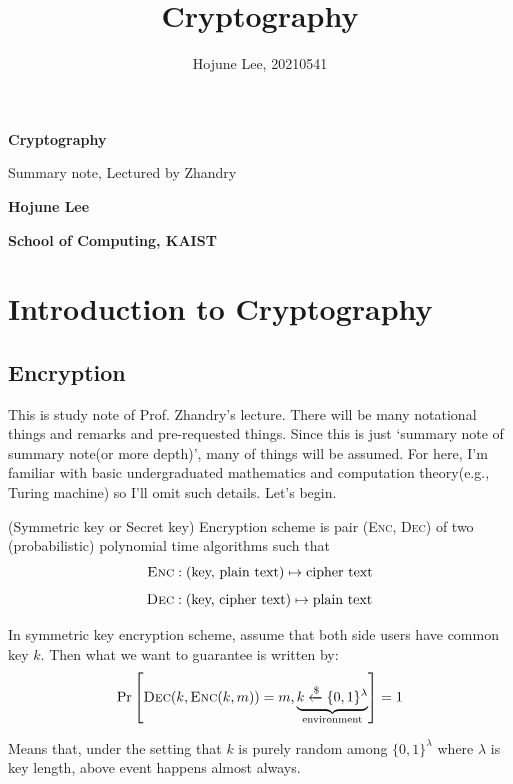 \documentclass[12pt, a4paper, openany, twoside]{book}
\author{Hojune Lee, 20210541}
\title{Cryptography}
\theoremstyle{definition}
\theoremstyle{remark}
\theoremstyle{plain}
\numberwithin{equation}{section}
\begin{document}
\begin{titlepage}
    \begin{center}
        \vspace*{9cm}
            
        \Huge
        \textbf{Cryptography}
    
        \vspace{1cm}
        \large
        Summary note, Lectured by Zhandry
        \vspace{3cm}
        
        \LARGE
        \textbf{Hojune Lee}
            
        \vspace{8cm}
            
        \normalsize
        \textbf{School of Computing, KAIST}\\  
    \end{center}
\end{titlepage}

\hypersetup{linkcolor=black}
\tableofcontents
\hypersetup{linkcolor=blue}

\newpage 

\chapter{Introduction to Cryptography}

\section{Encryption}

This is study note of Prof. Zhandry's lecture\cite{zhandry_crypto}. 
There will be many notational things and remarks and pre-requested things. 
Since this is just \lq summary note of summary note(or more depth)', many of things will be assumed. 
For here, I'm familiar with basic undergraduated mathematics and computation theory(e.g., Turing machine) 
so I'll omit such details. Let's begin. 

\begin{tcolorbox}[colback=yellow!10!white,colframe=red!75!black,title=Encryption(Symmetric key or Secret Key)]

(Symmetric key or Secret key) Encryption scheme is pair (\textsc{Enc}, \textsc{Dec}) of two (probabilistic) polynomial time algorithms such that 
\[\textsc{Enc} : (\text{key, plain text}) \mapsto \text{cipher text}\]
\[\textsc{Dec} : (\text{key, cipher text}) \mapsto \text{plain text}\]

In symmetric key encryption scheme, assume that both side users have common key $k$. 
Then what we want to guarantee is written by: 
\[\Pr\left[\textsc{Dec}(k, \textsc{Enc}(k, m)) = m, \underbrace{k \xleftarrow{\mathdollar} \{0,1\}^\lambda}_{\text{environment}} \right] = 1\] 

Means that, under the setting that $k$ is purely random among $\{0,1\}^\lambda$ where $\lambda$ is key length, 
above event happens almost always. 

\end{tcolorbox}
\end{document}
